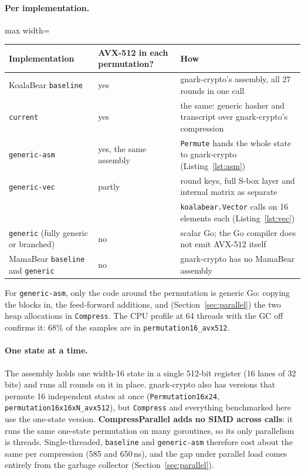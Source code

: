 \documentclass[10pt,a4paper]{article}
\begin{document}
\paragraph{Per implementation.}
\begin{center}\small
\begin{adjustbox}{max width=\linewidth}
\begin{tabular}{lll}
\toprule
Implementation & AVX-512 in each permutation? & How \\ \midrule
KoalaBear \texttt{baseline} & yes & gnark-crypto's assembly, all 27 rounds in one call \\
\texttt{current} & yes & the same: generic hasher and transcript over gnark-crypto's compression \\
\texttt{generic-asm} & yes, the same assembly & \texttt{Permute} hands the whole state to gnark-crypto (Listing~\ref{lst:asm}) \\
\texttt{generic-vec} & partly & round keys, full S-box layer and internal matrix as separate \\
 & & \texttt{koalabear.Vector} calls on 16 elements each (Listing~\ref{lst:vec}) \\
\texttt{generic} (fully generic or branched) & no & scalar Go; the Go compiler does not emit AVX-512 itself \\
MamaBear \texttt{baseline} and \texttt{generic} & no & gnark-crypto has no MamaBear assembly \\
\bottomrule
\end{tabular}
\end{adjustbox}
\end{center}
For \texttt{generic-asm}, only the code around the permutation is generic Go: copying the
blocks in, the feed-forward additions, and (Section~\ref{sec:parallel}) the two heap
allocations in \texttt{Compress}. The CPU profile at 64 threads with the GC off confirms it:
68\% of the samples are in \texttt{permutation16\_avx512}.

\paragraph{One state at a time.} The assembly holds one width-16 state in a single 512-bit
register (16 lanes of 32 bits) and runs all rounds on it in place. gnark-crypto also has
versions that permute 16 independent states at once (\texttt{Permutation16x24},
\texttt{permutation16x16xN\_avx512}), but \texttt{Compress} and everything benchmarked here
use the one-state version. \textbf{CompressParallel adds no SIMD across calls}: it runs the
same one-state permutation on many goroutines, so its only parallelism is threads.
Single-threaded, \texttt{baseline} and \texttt{generic-asm} therefore cost about the same per
compression (585 and 650\,ns), and the gap under parallel load comes entirely from the
garbage collector (Section~\ref{sec:parallel}).
\end{document}
